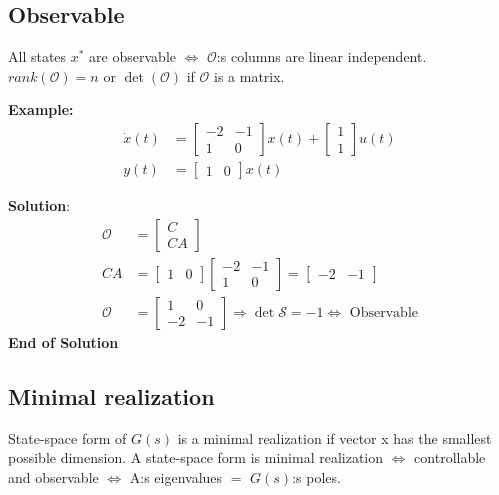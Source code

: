 \begin{multicols}{2}
\subsection{Observable}

All states $x^*$ are observable $\Leftrightarrow$ $\mathcal{O}$:s columns are linear independent.
$rank{(\mathcal{O})}=n$ or $\det{(\mathcal{O})}$ if $\mathcal{O}$ is a matrix.

\textbf{Example:}
\begin{align*}
    \dot{x}(t) &= \begin{bmatrix} -2 & -1 \\ 1 & 0 \end{bmatrix}x(t) + \begin{bmatrix} 1 \\ 1 \end{bmatrix}u(t) \\
    y(t) &= \begin{bmatrix} 1 & 0 \end{bmatrix}x(t)
\end{align*}

\textbf{Solution}:
\begin{align*} 
    \mathcal{O} &= \begin{bmatrix} C \\ CA \end{bmatrix} \\
    CA &= \begin{bmatrix} 1 & 0 \end{bmatrix} \begin{bmatrix} -2 & -1 \\ 1 & 0 \end{bmatrix} = \begin{bmatrix} -2 & -1 \end{bmatrix} \\
    \mathcal{O} &= \begin{bmatrix} 1 & 0 \\ -2 & -1 \end{bmatrix} \Rightarrow \det\mathcal{S} = -1 \Leftrightarrow \text{ Observable}
\end{align*}
\textbf{End of Solution}


\subsection{Minimal realization}
State-space form of $G(s)$ is a minimal realization if vector x has the smallest possible dimension.
A state-space form is minimal realization $\Leftrightarrow$ controllable and observable $\Leftrightarrow$ A:s eigenvalues $=$ $G(s)$:s poles.




\end{multicols}

